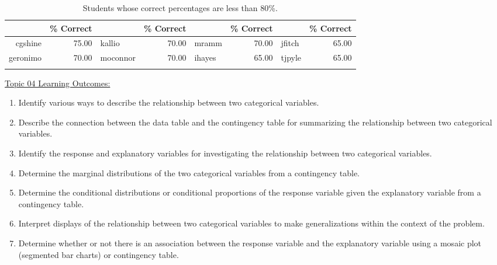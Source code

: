 \documentclass[12pt,english,nohyper]{tufte-handout}\usepackage[]{graphicx}\usepackage[]{color}
\begin{document}
\begin{fullwidth}
\makeatletter\setlength\hsize{\@tufte@fullwidth}\makeatother
\begin{longtable}{rr|lr|lr|lr}
  \hline
  & \% Correct &   & \% Correct &   & \% Correct &   & \% Correct \\ 
  \hline
cgshine & 75.00 & kallio & 70.00 & mramm & 70.00 & jfitch & 65.00 \\ 
  geronimo & 70.00 & moconnor & 70.00 & ihayes & 65.00 & tjpyle & 65.00 \\ 
   \hline
\hline
\caption{Students whose correct percentages are less than 80\%.} 
\label{tab:studentsbelow80}
\end{longtable}

\end{fullwidth}



\vspace{-2mm}

\noindent
\underline{Topic 04 Learning Outcomes:}
\vspace{2mm}

\begin{fullwidth}
\begin{enumerate}[label=\Alph*.,itemsep=-\parsep,leftmargin=*]
  \item
Identify various ways to describe the relationship between two categorical variables.
\item Describe the connection between the data table and the contingency table for summarizing the relationship between two categorical variables.
\item Identify the response and explanatory variables for investigating the relationship between two categorical variables.
\item Determine the marginal distributions of the two categorical variables from a contingency table.
\item Determine the conditional distributions or conditional proportions of the response variable given the explanatory variable from a contingency table.
\item Interpret displays of the relationship between two categorical variables to make generalizations within the context of the problem.
\item Determine whether or not there is an association between the response variable and the explanatory variable using a mosaic plot (segmented bar charts) or contingency table.

\end{enumerate}
\end{fullwidth}
\end{document}
